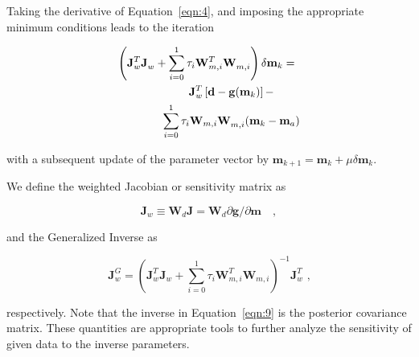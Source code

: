 \documentclass[cp]{copernicus}
\begin{document}
Taking the derivative of Equation~\ref{eqn:4}, and imposing the appropriate minimum conditions 
leads to the iteration
	
\begin{equation}\label{eqn:7}
\begin{gathered}
 \left(\mathbf{J}_w^T\mathbf{J}_w^{} + 
 \sum\limits_{i = 0}^1 \tau_i \mathbf{W}_{m,i}^T\mathbf{W}_{m,i}^{}\right) 
 \delta\mathbf{m}_k = \hfill \\
 \quad \quad \quad \quad \mathbf{J}_w^T\left[\mathbf{d}-
 \mathbf{g}(\mathbf{m}_k) \right] - \\
 \quad \quad \quad \quad \sum\limits_{i = 0}^1 \tau _i \mathbf{W}_{m,i} 
 \mathbf{W}_{m,i}^{}(\mathbf{m}_k - \mathbf{m}_a) \hfill \\ 
\end{gathered}
\end{equation} 

 \noindent with a subsequent update of the parameter vector by $\mathbf{m}_{k + 1} = \mathbf{m}_k + 
\mu \delta\mathbf{m}_k$.

We define the weighted Jacobian or sensitivity matrix as

\begin{equation}\label{eqn:8}
\mathbf{J}_w \equiv \mathbf{W}_d\mathbf{J} = 
\mathbf{W}_d\partial{\mathbf{g}}/\partial {\mathbf{m}}\quad, 
\end{equation} 

and the Generalized Inverse as

\begin{equation}\label{eqn:9}
\mathbf{J}_w^G = \left(\mathbf{J}_w^T \mathbf{J}_w^{} + 
\sum\limits_{i = 0}^1 \tau_i \mathbf{W}_{m,i}^T \mathbf{W}_{m,i}^{}\right)^{-1} 
\mathbf{J}_w^T{\text{ ,}}
\end{equation} 

respectively. Note that the inverse in Equation~\ref{eqn:9} is the posterior covariance matrix. 
These quantities are appropriate tools to further analyze the sensitivity of given data to the 
inverse parameters. 
\end{document}
